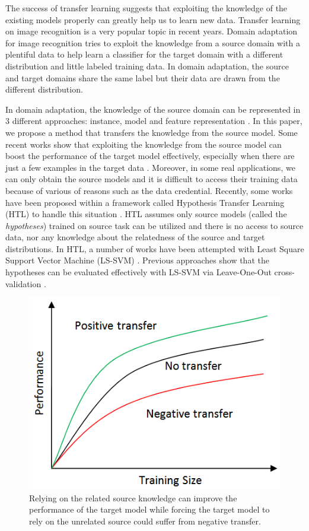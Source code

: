 The success of transfer learning suggests that exploiting the knowledge of the existing models properly can greatly help us to learn new data. 
Transfer learning on image recognition is a very popular topic in recent years. Domain adaptation for image recognition tries to exploit the knowledge from a source domain with a plentiful data to help learn a classifier for the target domain with a different distribution and little labeled training data. In domain adaptation, the source and target domains share the same label but their data are drawn from the different distribution.

In domain adaptation, the knowledge of the source domain can be represented in 3 different approaches: instance, model and feature representation \cite{pan2010survey}. In this paper, we propose a method that transfers the knowledge from the source model. Some recent works show that exploiting the knowledge from the source model can boost the performance of the target model effectively, especially when there are just a few examples in the target data \cite{tommasi2014learning} \cite{fei2006one}.
Moreover, in some real applications, we can only obtain the source models and it is difficult to access their training data because of various of reasons such as the data credential.   
Recently, some works have been proposed within a framework called Hypothesis Transfer Learning (HTL) to handle this situation \cite{kuzborskij2013stability}. HTL assumes only source models (called the \textit{hypotheses}) trained on source task can be utilized and there is no access to source data, nor any knowledge about the relatedness of the source and target distributions. 
In HTL, a number of works have been attempted with Least Square Support Vector Machine (LS-SVM) \cite{kuzborskij2013stability}. Previous approaches show that the hypotheses can be evaluated effectively with LS-SVM via Leave-One-Out cross-validation \cite{tommasi2014learning}.

\begin{figure}[h]
\centering
\includegraphics[scale=.5]{fig/negative.png}
\caption{Relying on the related source knowledge can improve the performance of the target model while forcing the target model to rely on the unrelated source could suffer from negative transfer.}
\end{figure}

